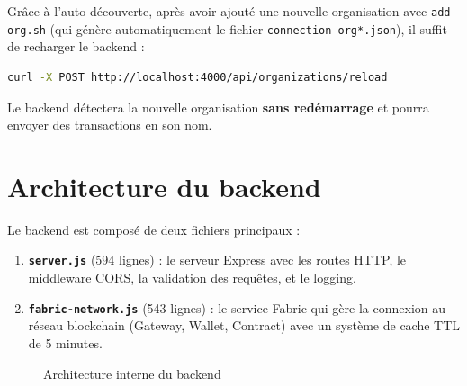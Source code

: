 \documentclass[12pt,a4paper,twoside]{report}
\begin{document}
\begin{tipbox}
Grâce à l'auto-découverte, après avoir ajouté une nouvelle organisation avec \texttt{add-org.sh} (qui génère automatiquement le fichier \texttt{connection-org*.json}), il suffit de recharger le backend :
\begin{lstlisting}[language=bash, numbers=none]
curl -X POST http://localhost:4000/api/organizations/reload
\end{lstlisting}
Le backend détectera la nouvelle organisation \textbf{sans redémarrage} et pourra envoyer des transactions en son nom.
\end{tipbox}

\section{Architecture du backend}

Le backend est composé de deux fichiers principaux :

\begin{enumerate}
    \item \textbf{\texttt{server.js}} (594 lignes) : le serveur Express avec les routes HTTP, le middleware CORS, la validation des requêtes, et le logging.
    \item \textbf{\texttt{fabric-network.js}} (543 lignes) : le service Fabric qui gère la connexion au réseau blockchain (Gateway, Wallet, Contract) avec un système de cache TTL de 5 minutes.
\end{enumerate}

\begin{figure}[H]
\centering
{}
\caption{Architecture interne du backend}
\end{figure}
\end{document}
